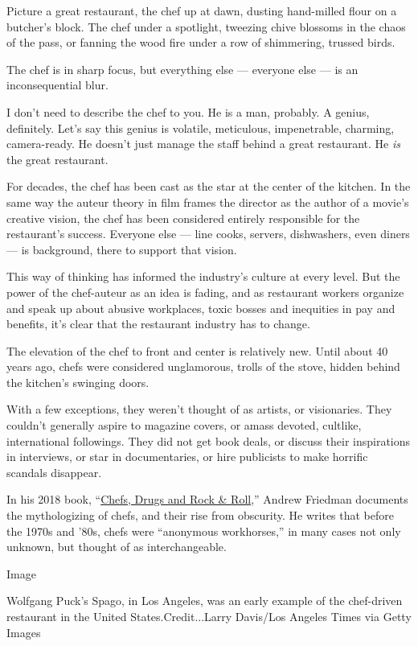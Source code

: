 Picture a great restaurant, the chef up at dawn, dusting hand-milled
flour on a butcher's block. The chef under a spotlight, tweezing chive
blossoms in the chaos of the pass, or fanning the wood fire under a row
of shimmering, trussed birds.

The chef is in sharp focus, but everything else --- everyone else --- is
an inconsequential blur.

I don't need to describe the chef to you. He is a man, probably. A
genius, definitely. Let's say this genius is volatile, meticulous,
impenetrable, charming, camera-ready. He doesn't just manage the staff
behind a great restaurant. He \emph{is} the great restaurant.

For decades, the chef has been cast as the star at the center of the
kitchen. In the same way the auteur theory in film frames the director
as the author of a movie's creative vision, the chef has been considered
entirely responsible for the restaurant's success. Everyone else ---
line cooks, servers, dishwashers, even diners --- is background, there
to support that vision.

This way of thinking has informed the industry's culture at every level.
But the power of the chef-auteur as an idea is fading, and as restaurant
workers organize and speak up about abusive workplaces, toxic bosses and
inequities in pay and benefits, it's clear that the restaurant industry
has to change.

The elevation of the chef to front and center is relatively new. Until
about 40 years ago, chefs were considered unglamorous, trolls of the
stove, hidden behind the kitchen's swinging doors.

With a few exceptions, they weren't thought of as artists, or
visionaries. They couldn't generally aspire to magazine covers, or amass
devoted, cultlike, international followings. They did not get book
deals, or discuss their inspirations in interviews, or star in
documentaries, or hire publicists to make horrific scandals disappear.

In his 2018 book,
``\href{https://www.barnesandnoble.com/w/chefs-drugs-and-rock-roll-andrew-friedman/1126512983}{Chefs,
Drugs and Rock \& Roll},'' Andrew Friedman documents the mythologizing
of chefs, and their rise from obscurity. He writes that before the 1970s
and '80s, chefs were ``anonymous workhorses,'' in many cases not only
unknown, but thought of as interchangeable.

Image

Wolfgang Puck's Spago, in Los Angeles, was an early example of the
chef-driven restaurant in the United States.Credit...Larry Davis/Los
Angeles Times via Getty Images

